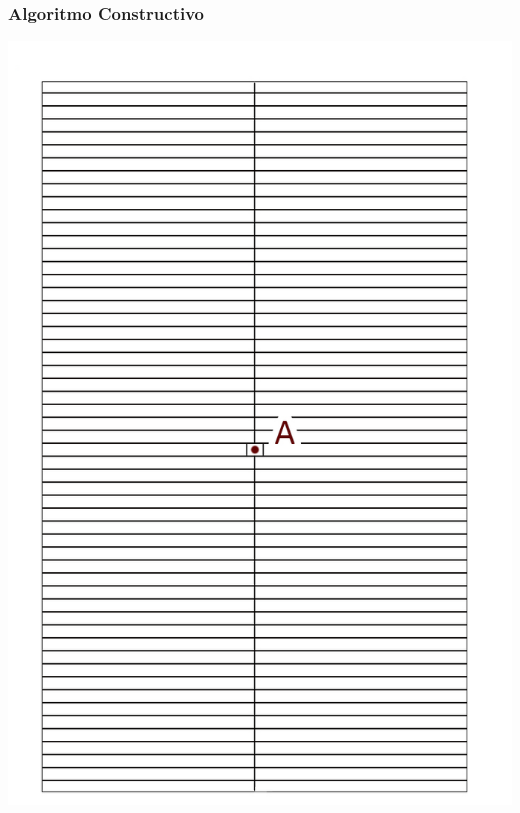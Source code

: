 \begin{frame}
    \frametitle{Algoritmo Constructivo}
    \endblock{}
		\begin{center}
    \includegraphics[height=0.8\textheight]{FIGURES/paso1}
		\end{center}
\end{frame}

